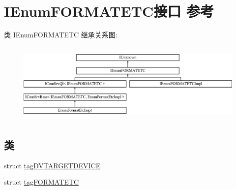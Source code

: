 \hypertarget{interface_i_enum_f_o_r_m_a_t_e_t_c}{}\section{I\+Enum\+F\+O\+R\+M\+A\+T\+E\+T\+C接口 参考}
\label{interface_i_enum_f_o_r_m_a_t_e_t_c}
类 I\+Enum\+F\+O\+R\+M\+A\+T\+E\+TC 继承关系图\+:\begin{figure}[H]
\begin{center}
\leavevmode
\includegraphics[height=4.000000cm]{interface_i_enum_f_o_r_m_a_t_e_t_c}
\end{center}
\end{figure}
\subsection*{类}
\begin{DoxyCompactItemize}
\item 
struct \hyperlink{struct_i_enum_f_o_r_m_a_t_e_t_c_1_1tag_d_v_t_a_r_g_e_t_d_e_v_i_c_e}{tag\+D\+V\+T\+A\+R\+G\+E\+T\+D\+E\+V\+I\+CE}
\item 
struct \hyperlink{struct_i_enum_f_o_r_m_a_t_e_t_c_1_1tag_f_o_r_m_a_t_e_t_c}{tag\+F\+O\+R\+M\+A\+T\+E\+TC}
\end{DoxyCompactItemize}
